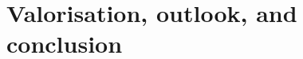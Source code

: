 \chapter{Valorisation, outlook, and conclusion}
\label{chap:5}






\printbibliography[title={References}]
